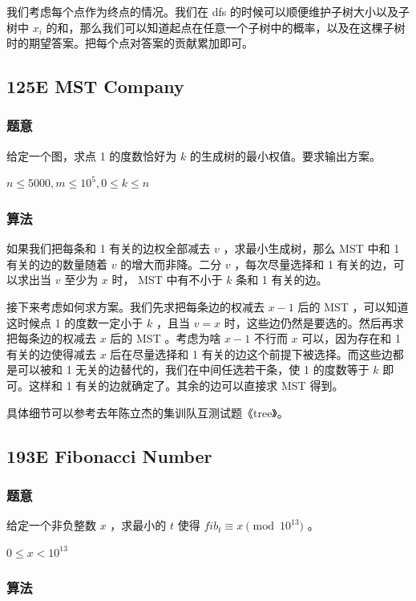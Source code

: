 \documentclass[11pt]{article}
\begin{document}
    我们考虑每个点作为终点的情况。我们在 dfs 的时候可以顺便维护子树大小以及子树中 $x_i$ 的和，那么我们可以知道起点在任意一个子树中的概率，以及在这棵子树时的期望答案。把每个点对答案的贡献累加即可。
\subsection{125E  MST Company}
\label{sec-8-7}
\subsubsection{题意}
\label{sec-8-7-1}

    给定一个图，求点 1 的度数恰好为 $k$ 的生成树的最小权值。要求输出方案。

    $n \leq 5000, m \leq 10^5, 0 \leq k \leq n$
\subsubsection{算法}
\label{sec-8-7-2}

    如果我们把每条和 1 有关的边权全部减去 $v$ ，求最小生成树，那么 MST 中和 1 有关的边的数量随着 $v$ 的增大而非降。二分 $v$ ，每次尽量选择和 1 有关的边，可以求出当 $v$ 至少为 $x$ 时， MST 中有不小于 $k$ 条和 1 有关的边。

    接下来考虑如何求方案。我们先求把每条边的权减去 $x - 1$ 后的 MST ，可以知道这时候点 1 的度数一定小于 $k$ ，且当 $v = x$ 时，这些边仍然是要选的。然后再求把每条边的权减去 $x$ 后的 MST 。考虑为啥 $x - 1$ 不行而 $x$ 可以，因为存在和 1 有关的边使得减去 $x$ 后在尽量选择和 1 有关的边这个前提下被选择。而这些边都是可以被和 1 无关的边替代的，我们在中间任选若干条，使 1 的度数等于 $k$ 即可。这样和 1 有关的边就确定了。其余的边可以直接求 MST 得到。

    具体细节可以参考去年陈立杰的集训队互测试题《tree》。
\subsection{193E  Fibonacci Number}
\label{sec-8-8}
\subsubsection{题意}
\label{sec-8-8-1}

    给定一个非负整数 $x$ ，求最小的 $t$ 使得 $fib_t \equiv x \pmod{10^{13}}$ 。

    $0 \leq x < 10^{13}$
\subsubsection{算法}
\label{sec-8-8-2}
\end{document}

